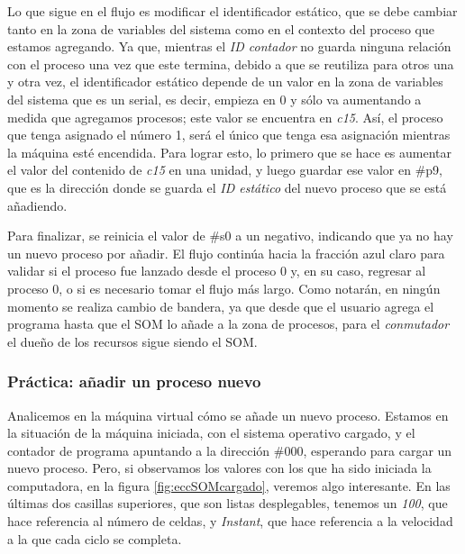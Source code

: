 \documentclass[letterpaper,12pt,oneside]{book}
\begin{document}
            Lo que sigue en el flujo  es modificar el identificador estático, que se debe cambiar
			tanto en la zona de variables del sistema como en el contexto del proceso que estamos agregando. Ya que, mientras el \textit{ID contador} 
			no guarda 
			ninguna
			relación con el proceso una vez que este termina, debido a que se reutiliza para otros una y otra vez, el identificador estático depende de un 
			valor
			en la zona de variables del sistema que es un serial, es decir, empieza en 0 y sólo va aumentando a medida que agregamos procesos; este
			valor se encuentra en \textit{c15}. Así, el 
			proceso que
			tenga asignado el número 1, será el único que tenga esa asignación mientras la máquina esté encendida. Para lograr esto, lo primero que se 
			hace es aumentar
			el valor del contenido de \textit{c15} en una unidad, y luego guardar ese valor en \#p9, que es la dirección donde se guarda el 
			\textit{ID estático}
			del nuevo proceso que se está añadiendo.
			
			Para finalizar, se reinicia el valor de \#s0 a un negativo, indicando que ya no hay un nuevo proceso por añadir. El flujo continúa
			hacia la fracción azul claro para validar si el proceso fue lanzado desde el proceso 0 y, en su caso,
			regresar al proceso 0, o si es necesario tomar el flujo más largo.
	        Como notarán, en ningún momento se realiza cambio de bandera, ya que desde que el usuario agrega el programa hasta que
			el SOM lo añade a la zona de procesos, para el \textit{conmutador} el dueño de los recursos sigue siendo el SOM.
			
			
		
		\subsubsection{Práctica: añadir un proceso nuevo }		
		
			Analicemos en la máquina virtual cómo se añade un nuevo proceso. Estamos en la situación
			de la máquina iniciada, con el sistema operativo cargado, y el contador de programa apuntando a  la dirección \#000,
			esperando para cargar un nuevo proceso. Pero, si observamos los valores con los que ha sido iniciada la computadora,
			en la figura \ref{fig:eccSOMcargado}, veremos algo interesante. En las últimas dos casillas superiores, que
			son listas desplegables, tenemos un \textit{100}, que hace referencia al número de celdas, y \textit{Instant}, que hace 
			referencia a la velocidad a la que cada ciclo se completa.
			
\end{document}
